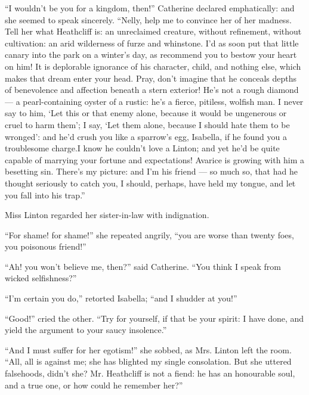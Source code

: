 \par “I wouldn't be you for a kingdom, then!” Catherine declared emphatically: and she seemed to speak sincerely. “Nelly, help me to convince her of her madness. Tell her what Heathcliff is: an unreclaimed creature, without refinement, without cultivation: an arid wilderness of furze and whinstone. I'd as soon put that little canary into the park on a winter's day, as recommend you to bestow your heart on him! It is deplorable ignorance of his character, child, and nothing else, which makes that dream enter your head. Pray, don't imagine that he conceals depths of benevolence and affection beneath a stern exterior! He's not a rough diamond — a pearl-containing oyster of a rustic: he's a fierce, pitiless, wolfish man. I never say to him, ‘Let this or that enemy alone, because it would be ungenerous or cruel to harm them'; I say, ‘Let them alone, because I should hate them to be wronged': and he'd crush you like a sparrow's egg, Isabella, if he found you a troublesome charge.I know he couldn't love a Linton; and yet he'd be quite capable of marrying your fortune and expectations! Avarice is growing with him a besetting sin. There's my picture: and I'm his friend — so much so, that had he thought seriously to catch you, I should, perhaps, have held my tongue, and let you fall into his trap.”
\par Miss Linton regarded her sister-in-law with indignation.
\par “For shame! for shame!” she repeated angrily, “you are worse than twenty foes, you poisonous friend!”
\par “Ah! you won't believe me, then?” said Catherine. “You think I speak from wicked selfishness?”
\par “I'm certain you do,” retorted Isabella; “and I shudder at you!”
\par “Good!” cried the other. “Try for yourself, if that be your spirit: I have done, and yield the argument to your saucy insolence.”
\par “And I must suffer for her egotism!” she sobbed, as Mrs. Linton left the room. “All, all is against me; she has blighted my single consolation. But she uttered falsehoods, didn't she? Mr. Heathcliff is not a fiend: he has an honourable soul, and a true one, or how could he remember her?”

